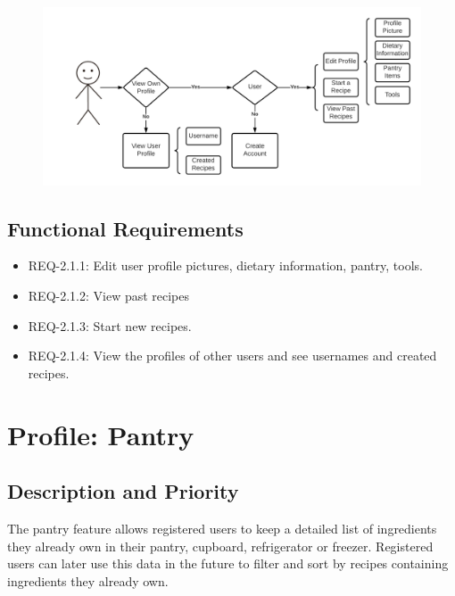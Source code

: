 \documentclass{scrreprt}
\begin{document}
\begin{figure}[H]\centering
    \includegraphics[width=\columnwidth]{FlowCharts/Profile-Profile.png}
\end{figure}

\subsection{\gls{Functional Requirements}}

\begin{itemize}
    \item REQ-2.1.1: Edit user profile pictures, dietary information, pantry, tools.
    \item REQ-2.1.2: View past recipes
    \item REQ-2.1.3: Start new recipes.
    \item REQ-2.1.4: View the profiles of other users and see usernames and created recipes.
\end{itemize}

\section{Profile: Pantry}

\subsection{Description and Priority}

The pantry feature allows registered users to keep a detailed list of ingredients they already own in their pantry, cupboard, refrigerator or freezer. Registered users can later use this data in the future to filter and sort by recipes containing ingredients they already own.
\end{document}
